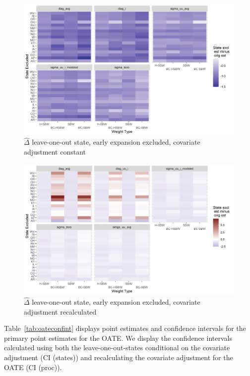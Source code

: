 \begin{figure}[]
\begin{center}
    \caption{$\hat{\Delta}$ leave-one-out state, early expansion excluded, covariate adjustment constant}
    \label{fig:rdiffc2state}
    \includegraphics[scale=0.6]{01_Plots/loostate-repub-sensitivityc2-state-main.png}
\end{center}
\end{figure}

\begin{figure}[]
\begin{center}
    \caption{$\hat{\Delta}$ leave-one-out state, early expansion excluded, covariate adjustment recalculated}
    \label{fig:rdiffc2proc}
    \includegraphics[scale=0.6]{01_Plots/loostate-repub-sensitivityc2-proc-main.png}
\end{center}
\end{figure}

Table~\ref{tab:oateconfint} displays point estimates and confidence intervals for the primary point estimates for the OATE. We display the confidence intervals calculated using both the leave-one-out-states conditional on the covariate adjustment (CI (states)) and recalculating the covariate adjustment for the OATE (CI (proc)). 

